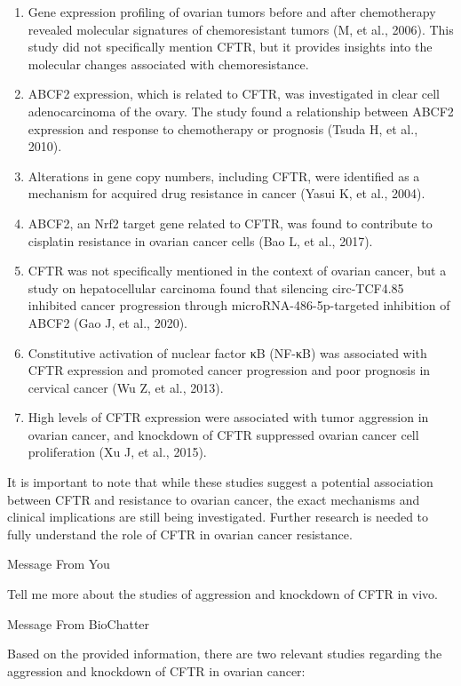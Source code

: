 \begin{enumerate}
\def\labelenumi{\arabic{enumi}.}
\item
  Gene expression profiling of ovarian tumors before and after chemotherapy revealed molecular signatures of chemoresistant tumors (M, et al., 2006). This study did not specifically mention CFTR, but it provides insights into the molecular changes associated with chemoresistance.
\item
  ABCF2 expression, which is related to CFTR, was investigated in clear cell adenocarcinoma of the ovary. The study found a relationship between ABCF2 expression and response to chemotherapy or prognosis (Tsuda H, et al., 2010).
\item
  Alterations in gene copy numbers, including CFTR, were identified as a mechanism for acquired drug resistance in cancer (Yasui K, et al., 2004).
\item
  ABCF2, an Nrf2 target gene related to CFTR, was found to contribute to cisplatin resistance in ovarian cancer cells (Bao L, et al., 2017).
\item
  CFTR was not specifically mentioned in the context of ovarian cancer, but a study on hepatocellular carcinoma found that silencing circ-TCF4.85 inhibited cancer progression through microRNA-486-5p-targeted inhibition of ABCF2 (Gao J, et al., 2020).
\item
  Constitutive activation of nuclear factor κB (NF-κB) was associated with CFTR expression and promoted cancer progression and poor prognosis in cervical cancer (Wu Z, et al., 2013).
\item
  High levels of CFTR expression were associated with tumor aggression in ovarian cancer, and knockdown of CFTR suppressed ovarian cancer cell proliferation (Xu J, et al., 2015).
\end{enumerate}

It is important to note that while these studies suggest a potential association between CFTR and resistance to ovarian cancer, the exact mechanisms and clinical implications are still being investigated. Further research is needed to fully understand the role of CFTR in ovarian cancer resistance.

Message From You

Tell me more about the studies of aggression and knockdown of CFTR in vivo.

Message From BioChatter

Based on the provided information, there are two relevant studies regarding the aggression and knockdown of CFTR in ovarian cancer:


